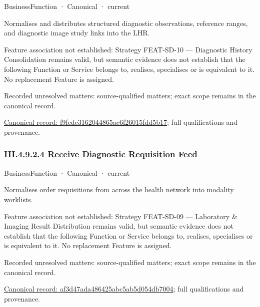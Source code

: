 \label{element:f9fcdc3162044865ac6f26015fdd5b17}
{\small BusinessFunction · Canonical · current}\par

Normalises and distributes structured diagnostic observations, reference ranges, and diagnostic image study links into the LHR.



Feature association not established: Strategy FEAT-SD-10 — Diagnostic History Consolidation remains valid, but semantic evidence does not establish that the following Function or Service belongs to, realises, specialises or is equivalent to it. No replacement Feature is assigned.


{\small Recorded unresolved matters: source-qualified matters; exact scope remains in the canonical record.}\par
{\footnotesize \href{../../../../../../../../continuum/business/business-function/f9fcdc3162044865ac6f26015fdd5b17.md}{Canonical record: f9fcdc3162044865ac6f26015fdd5b17}; full qualifications and provenance.}\par
\subsubsection*{III.4.9.2.4 Receive Diagnostic Requisition Feed}
\label{navigation:III.4.9.2.4}

\label{element:af3d47ada486425abc5ab5d054db7004}
{\small BusinessFunction · Canonical · current}\par

Normalises order requisitions from across the health network into modality worklists.



Feature association not established: Strategy FEAT-SD-09 — Laboratory \& Imaging Result Distribution remains valid, but semantic evidence does not establish that the following Function or Service belongs to, realises, specialises or is equivalent to it. No replacement Feature is assigned.


{\small Recorded unresolved matters: source-qualified matters; exact scope remains in the canonical record.}\par
{\footnotesize \href{../../../../../../../../continuum/business/business-function/af3d47ada486425abc5ab5d054db7004.md}{Canonical record: af3d47ada486425abc5ab5d054db7004}; full qualifications and provenance.}\par

